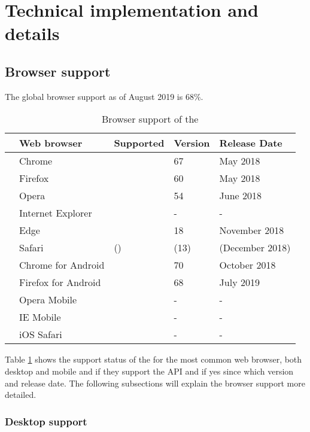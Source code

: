 \section{Technical implementation and details}

\subsection{Browser support}

The global browser support as of August 2019 is 68\%.

\begin{table}[ht]
\renewcommand\thetable{1}
\begin{tabularx}{\textwidth}{l|p{4cm}|p{2.5cm}|p{2cm}|p{3.5cm}}
	& Web browser & Supported & Version & Release Date \\
	\hline
	\parbox[t]{2mm}{} & Chrome & \OK & 67 & May 2018 \\
	& Firefox & \OK & 60 & May 2018 \\
	& Opera & \OK & 54 & June 2018 \\
	& Internet Explorer & \NOOK & - & - \\
	& Edge & \OK & 18 & November 2018 \\
	& Safari & (\OK) & (13) & (December 2018) \\
	\hline
	\parbox[t]{2mm}{} & Chrome for Android & \OK & 70 & October 2018 \\
	& Firefox for Android & \OK & 68 & July 2019 \\
	& Opera Mobile & \NOOK & - & - \\
	& IE Mobile & \NOOK & - & - \\
	& iOS Safari & \NOOK & - & - \\
	\hline
\end{tabularx}
\caption[Browser support of the \wa{}]{Browser support of the \wa{}\footnotemark} \label{tab:browser-support}
\end{table}

Table \ref{tab:browser-support} shows the support status of the \wa{} for the most common web browser, both desktop and mobile and if they support the API and if yes since which version and release date. The following subsections will explain the browser support more detailed.

\subsubsection{Desktop support}

